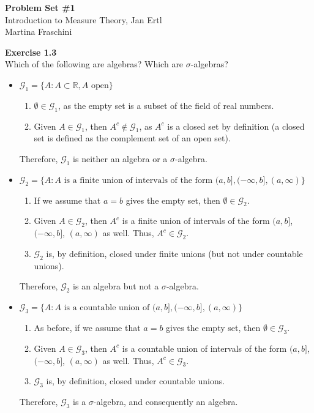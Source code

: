 \documentclass[letterpaper,12pt]{article}
\theoremstyle{definition}
\begin{document}
\begin{flushleft}
  \textbf{\large{Problem Set \#1}} \\
  Introduction to Measure Theory, Jan Ertl \\
  Martina Fraschini
\end{flushleft}

\vspace{5mm}

\noindent\textbf{Exercise 1.3}\\
Which of the following are algebras? Which are $\sigma$-algebras?
\begin{itemize}
\item $\mathcal{G}_1=\{A:A\subset\mathds{R}, A\textrm{ open}\}$
	\begin{enumerate}
	\item $\emptyset \in\mathcal{G}_1$, as the empty set is a subset of the field of real numbers.
	\item Given $A\in\mathcal{G}_1$, then $A^c\notin\mathcal{G}_1$, as $A^c$ is a closed set by definition (a closed set is defined as the complement set of an open set).
	\end{enumerate}
	Therefore, $\mathcal{G}_1$ is neither an algebra or a $\sigma$-algebra.
\item $\mathcal{G}_2=\{A:A\textrm{ is a finite union of intervals of the form } (a,b], (-\infty,b], (a,\infty)\}$
	\begin{enumerate}
	\item If we assume that $a=b$ gives the empty set, then $\emptyset \in\mathcal{G}_2$.
	\item Given $A\in\mathcal{G}_2$, then $A^c$ is a finite union of intervals of the form $(a,b]$, $(-\infty,b]$, $(a,\infty)$ as well. Thus, $A^c\in\mathcal{G}_2$.
	\item $\mathcal{G}_2$ is, by definition, closed under finite unions (but not under countable unions).
	\end{enumerate}
	Therefore, $\mathcal{G}_2$ is an algebra but not a $\sigma$-algebra.
\item $\mathcal{G}_3=\{A:A\textrm{ is a countable union of } (a,b], (-\infty,b], (a,\infty)\}$
	\begin{enumerate}
	\item As before, if we assume that $a=b$ gives the empty set, then $\emptyset \in\mathcal{G}_3$.
	\item Given $A\in\mathcal{G}_3$, then $A^c$ is a countable union of intervals of the form $(a,b]$, $(-\infty,b]$, $(a,\infty)$ as well. Thus, $A^c\in\mathcal{G}_3$.
	\item $\mathcal{G}_3$ is, by definition, closed under countable unions.
	\end{enumerate}
	Therefore, $\mathcal{G}_3$ is a $\sigma$-algebra, and consequently an algebra.
\end{itemize}
\bigskip
\end{document}

